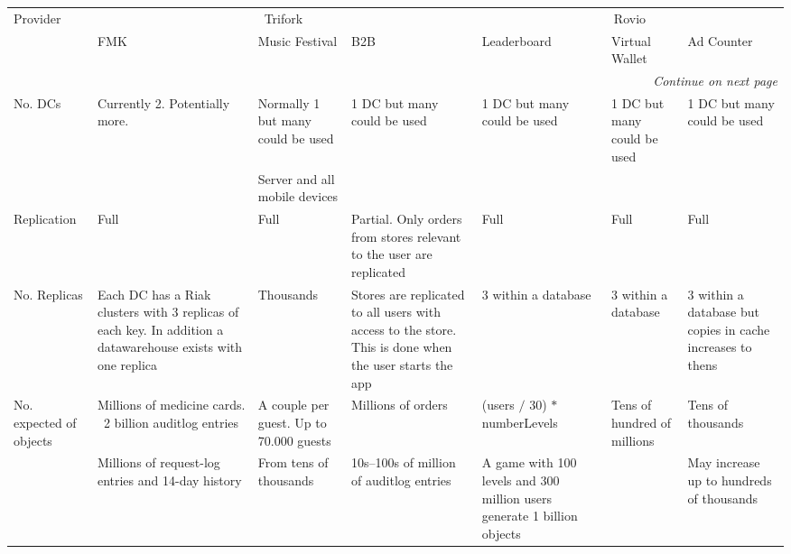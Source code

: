 \begin{landscape}
	\small  %
	\begin{center}
		 \begin{longtable}{|p{2.2cm}||p{3.6cm}|p{3.4cm}|p{3.4cm}||p{3.8cm}|p{3.4cm}|p{3.1cm}|}
			\hline
			Provider & 
				\multicolumn{3}{c|}{Trifork} & 
				\multicolumn{3}{c|}{Rovio} \\ \cline{2-7}

			     & 
				FMK & 
				Music Festival & 
				B2B & 
				Leaderboard & 
				Virtual Wallet & 
				Ad Counter \\
			\hline
			\hline
			\endhead
			\hline \multicolumn{7}{r}{\textit{Continue on next page}} \\
			\endfoot
			\endlastfoot

			No. DCs	& 
				Currently 2. Potentially more.	& 
				Normally 1 but many could be used & 
				1 DC but many could be used & 
				1 DC but many could be used & 
				1 DC but many could be used	& 
				1 DC but many could be used \\\cline{3-3}
	
			       & 
			       & 
			     Server and all mobile devices  & 
			       & 
			       &  
			       & \\
			\hline
	
			Replication & 
				Full & 
				Full & 
				Partial. Only orders from stores relevant to the user are replicated & 
				Full & 
				Full & 
				Full \\
			\hline
	
			No. Replicas & 
				Each DC has a Riak clusters with 3 replicas of each key. In addition a datawarehouse exists with one replica & 
				Thousands & 
				Stores are replicated to all users with access to the store. This is done when the user starts the app & 
				3 within a database	& 
				3 within a database	& 
				3 within a database but copies in cache increases to thens \\
			\hline
	
			No. expected of objects & 
				Millions of medicine cards. ~2 billion auditlog entries & 
				A couple per guest. Up to 70.000 guests & 
				Millions of orders & 
				(users $/$ 30) $*$ numberLevels & 
				Tens of hundred of millions &
				Tens of thousands \\ \cline{2-5} \cline{7-7}
			
				 & 
				Millions of request-log entries and 14-day history & 
				From tens of thousands & 
				10s--100s of million of auditlog entries & 
				A game with 100 levels and 300 million users generate 1 billion objects & 
				 & 
				May increase up to hundreds of thousands \\ \cline{2-3} \cline{4-5} \cline{7-7}
	

\end{longtable}
\end{center}
\end{landscape}
